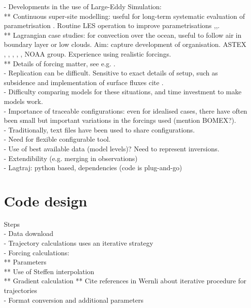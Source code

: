 \documentclass[a4paper,11pt]{article}
\begin{document}
- Developments in the use of Large-Eddy Simulation: \\
** Continuous super-site modelling: useful for long-term systematic
evaluation of parametrisation \cite{neggers2012}. Routine LES operation
to improve parametrisations
\cite{schalkwijk2015},\cite{laar2019},\cite{gustafson2020}. \\
** Lagrangian case studies: for convection over the ocean, useful to
follow air in boundary layer or low clouds. Aim: capture development of
organisation. ASTEX \cite{bretherton1999}, \cite{roode2016},
\cite{tomassini2017}, \cite{mohrmann2019}, \cite{neggers2019}, NOAA
group. Experience using realistic forcings. \\
** Details of forcing matter, see e.g. \cite{smalley2019}. \\
- Replication can be difficult. Sensitive to exact details of setup, such as subsidence \citep{kurowski2020} and implementation of surface fluxes cite \citep{stevens2001}. \\
- Difficulty comparing models for these situations, and time investment to make models work. \\
- Importance of traceable configurations: even for idealised cases, there have often been small but important variations in the forcings used (mention BOMEX?). \\
- Traditionally, text files have been used to share configurations. \\
- Need for flexible configurable tool. \\
- Use of best available data \cite{hersbach2020} (model levels)? Need to represent inversions. \\
- Extendibility (e.g. merging in observations) \\
- Lagtraj: python based, dependencies (code is plug-and-go) \\

\section{Code design}

Steps \\
- Data download \\
- Trajectory calculations uses an iterative strategy \citep{petterssen1956,sprenger2015} \\
- Forcing calculations: \\
** Parameters \\
** Use of Steffen interpolation \citep{yamaguchi2012} \\
** Gradient calculation
** Cite references in Wernli about iterative procedure for trajectories \\
- Format conversion and additional parameters \\
\end{document}
